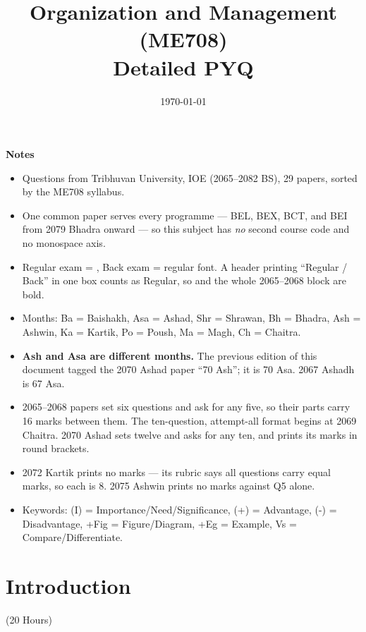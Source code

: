 \documentclass[12pt]{article}
\title{Organization and Management (ME708)\\[0.4em]\large Detailed PYQ}
\author{}
\date{\today}
\begin{document}
\maketitle
\vspace{6cm}
\textbf{Notes}
\begin{itemize}[noitemsep]
  \item Questions from Tribhuvan University, IOE (2065--2082 BS), 29 papers, sorted by the ME708 syllabus.
  \item One common paper serves every programme --- BEL, BEX, BCT, and BEI from 2079 Bhadra onward --- so this subject has \emph{no} second course code and no monospace axis.
  \item Regular exam = , Back exam = regular font. A header printing ``Regular / Back'' in one box counts as Regular, so  and the whole 2065--2068 block are bold.
  \item Months: Ba = Baishakh, Asa = Ashad, Shr = Shrawan, Bh = Bhadra, Ash = Ashwin, Ka = Kartik, Po = Poush, Ma = Magh, Ch = Chaitra.
  \item \textbf{Ash and Asa are different months.} The previous edition of this document tagged the 2070 Ashad paper ``70 Ash''; it is \bo{}70 Asa. 2067 Ashadh is 67 Asa.
  \item 2065--2068 papers set six questions and ask for any five, so their parts carry 16 marks between them. The ten-question, attempt-all format begins at 2069 Chaitra. 2070 Ashad sets twelve and asks for any ten, and prints its marks in round brackets.
  \item 2072 Kartik prints no marks --- its rubric says all questions carry equal marks, so each is 8. 2075 Ashwin prints no marks against Q5 alone.
  \item Keywords: (I) = Importance/Need/Significance, (+) = Advantage, (-) = Disadvantage, +Fig = Figure/Diagram, +Eg = Example, Vs = Compare/Differentiate.
\end{itemize}
\pagebreak
\tableofcontents
\pagebreak

\section{Introduction}
\begin{center}(20 Hours)\end{center}
\end{document}
